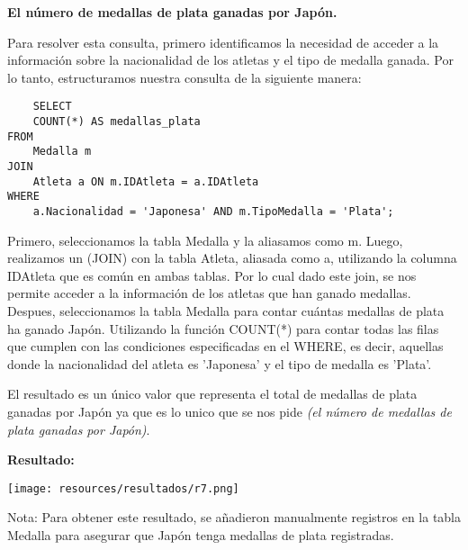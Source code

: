 \textbf{El número de medallas de plata ganadas por Japón.}\vspace{.3cm}

Para resolver esta consulta, primero identificamos la necesidad de acceder a la información sobre la nacionalidad de los atletas y el tipo de medalla ganada. Por lo tanto, estructuramos nuestra consulta de la siguiente manera: \vspace{.3cm}

\begin{lstlisting}
    SELECT 
    COUNT(*) AS medallas_plata
FROM 
    Medalla m
JOIN 
    Atleta a ON m.IDAtleta = a.IDAtleta
WHERE 
    a.Nacionalidad = 'Japonesa' AND m.TipoMedalla = 'Plata';
\end{lstlisting}

 \vspace{.3cm}

Primero, seleccionamos la tabla Medalla y la aliasamos como m. Luego, realizamos un (JOIN) con la tabla Atleta, aliasada como a, utilizando la columna IDAtleta que es común en ambas tablas. Por lo cual dado este join, se nos permite acceder a la información de los atletas que han ganado medallas. \\

Despues, seleccionamos la tabla Medalla para contar cuántas medallas de plata ha ganado Japón. Utilizando la función COUNT(*) para contar todas las filas que cumplen con las condiciones especificadas en el WHERE, es decir, aquellas donde la nacionalidad del atleta es 'Japonesa' y el tipo de medalla es 'Plata'. \vspace{.3cm}

El resultado es un único valor que representa el total de medallas de plata ganadas por Japón ya que es lo unico que se nos pide \textit{(el número de medallas de plata ganadas por Japón)}. \vspace{.3cm}

\textbf{Resultado:}
\begin{center}
    \texttt{[image: resources/resultados/r7.png]}
\end{center}   

Nota: Para obtener este resultado, se añadieron manualmente registros en la tabla Medalla para asegurar que Japón tenga medallas de plata registradas. \vspace{.3cm}